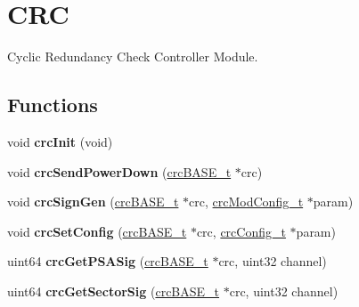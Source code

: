 \hypertarget{group__CRC}{}\section{C\+RC}
\label{group__CRC}


Cyclic Redundancy Check Controller Module.  


\subsection*{Functions}
\begin{DoxyCompactItemize}
\item 
\mbox{\label{group__CRC_ga5a735798e6972adc694a5428dd7ccaf9}} 
void {\bfseries crc\+Init} (void)
\item 
\mbox{\label{group__CRC_gae40127ece03dcad369c9f97beb1896a1}} 
void {\bfseries crc\+Send\+Power\+Down} (\mbox{\hyperlink{reg__crc_8h_a5d27a33c6347de7aac595ad4daefb611}{crc\+B\+A\+S\+E\+\_\+t}} $\ast$crc)
\item 
\mbox{\label{group__CRC_ga2cc29c9cd4a9604d8edf06506936b19f}} 
void {\bfseries crc\+Sign\+Gen} (\mbox{\hyperlink{reg__crc_8h_a5d27a33c6347de7aac595ad4daefb611}{crc\+B\+A\+S\+E\+\_\+t}} $\ast$crc, \mbox{\hyperlink{structcrcModConfig}{crc\+Mod\+Config\+\_\+t}} $\ast$param)
\item 
\mbox{\label{group__CRC_ga2621dbc94ada9e412d044a642e0ccae7}} 
void {\bfseries crc\+Set\+Config} (\mbox{\hyperlink{reg__crc_8h_a5d27a33c6347de7aac595ad4daefb611}{crc\+B\+A\+S\+E\+\_\+t}} $\ast$crc, \mbox{\hyperlink{structcrcConfig}{crc\+Config\+\_\+t}} $\ast$param)
\item 
\mbox{\label{group__CRC_gaeadba4ed7fdff253219b22953d45c2dd}} 
uint64 {\bfseries crc\+Get\+P\+S\+A\+Sig} (\mbox{\hyperlink{reg__crc_8h_a5d27a33c6347de7aac595ad4daefb611}{crc\+B\+A\+S\+E\+\_\+t}} $\ast$crc, uint32 channel)
\item 
\mbox{\label{group__CRC_ga3589a732026fb336330619c5db4a99e4}} 
uint64 {\bfseries crc\+Get\+Sector\+Sig} (\mbox{\hyperlink{reg__crc_8h_a5d27a33c6347de7aac595ad4daefb611}{crc\+B\+A\+S\+E\+\_\+t}} $\ast$crc, uint32 channel)
\item 
\mbox{\label{group__CRC_ga9991fa065462d01dd9fbde1c320d986c}} 

\end{DoxyCompactItemize}
